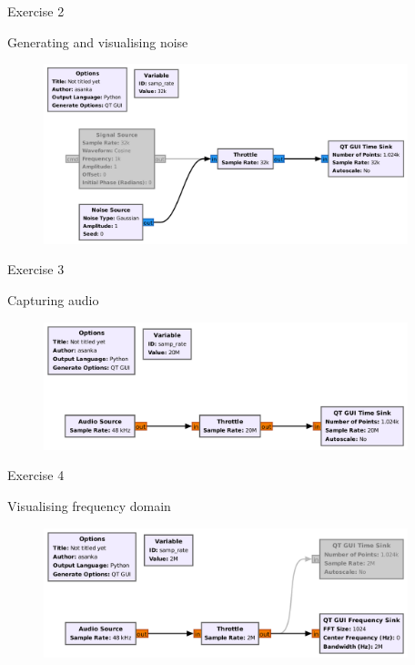 \documentclass[handout]{beamer}
\begin{document}
\begin{frame}{Exercise 2}  

\footnotesize
Generating and visualising noise

	\begin{figure}
		\includegraphics[width=300pt]{figures/Example-2.pdf}
	\end{figure}

\end{frame}


\begin{frame}{Exercise 3}  

\footnotesize
Capturing audio

	\begin{figure}
		\includegraphics[width=300pt]{figures/Example-3.pdf}
	\end{figure}

\end{frame}


\begin{frame}{Exercise 4}  

\footnotesize
Visualising frequency domain

	\begin{figure}
		\includegraphics[width=300pt]{figures/Example-4.pdf}
	\end{figure}

\end{frame}
\end{document}
